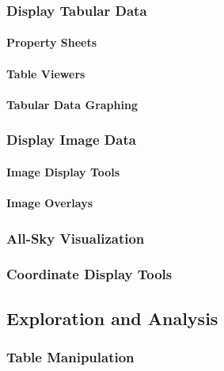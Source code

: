 \documentclass[SE,toc,lsstdraft]{lsstdoc}
\begin{document}
\subsubsection{Display Tabular Data}

\paragraph{Property Sheets}\hfill  %

\paragraph{Table Viewers}\hfill  %

\paragraph{Tabular Data Graphing}\hfill  %

\subsubsection{Display Image Data}

\paragraph{Image Display Tools}\hfill  %

\paragraph{Image Overlays}\hfill  %

\subsubsection{All-Sky Visualization}

\subsubsection{Coordinate Display Tools}

\subsection{Exploration and Analysis}

\subsubsection{Table Manipulation}
\end{document}
